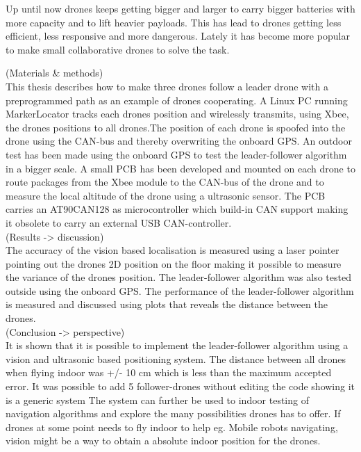 Up until now drones keeps getting bigger and larger to carry bigger batteries with more capacity and to lift heavier payloads. This has lead to drones getting less efficient, less responsive and more dangerous. 
Lately it has become more popular to make small collaborative drones to solve the task.

(Materials \& methods) \\
This thesis describes how to make three drones follow a leader drone with a preprogrammed path as an example of drones cooperating. A Linux PC running MarkerLocator tracks each drones position and wirelessly transmits, using Xbee, the drones positions to all drones.The position of each drone is spoofed into the drone using the CAN-bus and thereby overwriting the onboard GPS. An outdoor test has been made using the onboard GPS to test the leader-follower algorithm in a bigger scale. A small PCB has been developed and mounted on each drone to route packages from the Xbee module to the CAN-bus of the drone and to measure the local altitude of the drone using a ultrasonic sensor. The PCB carries an AT90CAN128 as microcontroller which build-in CAN support making it obsolete to carry an external USB CAN-controller.\\


(Results -> discussion)\\
The accuracy of the vision based localisation is measured using a laser pointer pointing out the drones 2D position on the floor making it possible to measure the variance of the drones position. The leader-follower algorithm was also tested outside using the onboard GPS. The performance of the leader-follower algorithm is measured and discussed using plots that reveals the distance between the drones.\\

(Conclusion -> perspective)\\
It is shown that it is possible to implement the leader-follower algorithm using a vision and ultrasonic based positioning system. The distance between all drones when flying indoor was +/- 10 cm which is less than the maximum accepted error. It was possible to add 5 follower-drones without editing the code showing it is a generic system The system can further be used to indoor testing of navigation algorithms and explore the many possibilities drones has to offer. If drones at some point needs to fly indoor to help eg. Mobile robots navigating, vision might be a way to obtain a absolute indoor position for the drones.